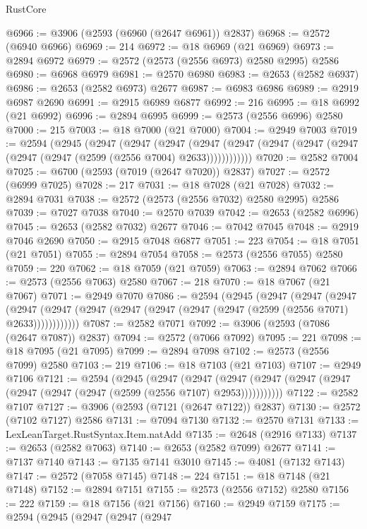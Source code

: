 \begin{lexlean}{RustCore}
\begin{coremodule}
@6966 := @3906 (@2593 (@6960 (@2647 @6961)) @2837)
@6968 := @2572 (@6940 @6966)
@6969 := 214
@6972 := @18 @6969 (@21 @6969)
@6973 := @2894 @6972
@6979 := @2572 (@2573 (@2556 @6973) @2580 @2995) @2586
@6980 := @6968 @6979
@6981 := @2570 @6980
@6983 := @2653 (@2582 @6937)
@6986 := @2653 (@2582 @6973) @2677
@6987 := @6983 @6986
@6989 := @2919 @6987 @2690
@6991 := @2915 @6989 @6877
@6992 := 216
@6995 := @18 @6992 (@21 @6992)
@6996 := @2894 @6995
@6999 := @2573 (@2556 @6996) @2580
@7000 := 215
@7003 := @18 @7000 (@21 @7000)
@7004 := @2949 @7003
@7019 := @2594
    (@2945
      (@2947
        (@2947
          (@2947
            (@2947 (@2947 (@2947 (@2947 (@2947 (@2947 (@2947 (@2599 (@2556 @7004) @2633))))))))))))
@7020 := @2582 @7004
@7025 := @6700 (@2593 (@7019 (@2647 @7020)) @2837)
@7027 := @2572 (@6999 @7025)
@7028 := 217
@7031 := @18 @7028 (@21 @7028)
@7032 := @2894 @7031
@7038 := @2572 (@2573 (@2556 @7032) @2580 @2995) @2586
@7039 := @7027 @7038
@7040 := @2570 @7039
@7042 := @2653 (@2582 @6996)
@7045 := @2653 (@2582 @7032) @2677
@7046 := @7042 @7045
@7048 := @2919 @7046 @2690
@7050 := @2915 @7048 @6877
@7051 := 223
@7054 := @18 @7051 (@21 @7051)
@7055 := @2894 @7054
@7058 := @2573 (@2556 @7055) @2580
@7059 := 220
@7062 := @18 @7059 (@21 @7059)
@7063 := @2894 @7062
@7066 := @2573 (@2556 @7063) @2580
@7067 := 218
@7070 := @18 @7067 (@21 @7067)
@7071 := @2949 @7070
@7086 := @2594
    (@2945
      (@2947
        (@2947
          (@2947
            (@2947 (@2947 (@2947 (@2947 (@2947 (@2947 (@2947 (@2599 (@2556 @7071) @2633))))))))))))
@7087 := @2582 @7071
@7092 := @3906 (@2593 (@7086 (@2647 @7087)) @2837)
@7094 := @2572 (@7066 @7092)
@7095 := 221
@7098 := @18 @7095 (@21 @7095)
@7099 := @2894 @7098
@7102 := @2573 (@2556 @7099) @2580
@7103 := 219
@7106 := @18 @7103 (@21 @7103)
@7107 := @2949 @7106
@7121 := @2594
    (@2945
      (@2947
        (@2947
          (@2947 (@2947 (@2947 (@2947 (@2947 (@2947 (@2947 (@2599 (@2556 @7107) @2953)))))))))))
@7122 := @2582 @7107
@7127 := @3906 (@2593 (@7121 (@2647 @7122)) @2837)
@7130 := @2572 (@7102 @7127) @2586
@7131 := @7094 @7130
@7132 := @2570 @7131
@7133 := LexLeanTarget.RustSyntax.Item.natAdd
@7135 := @2648 (@2916 @7133)
@7137 := @2653 (@2582 @7063)
@7140 := @2653 (@2582 @7099) @2677
@7141 := @7137 @7140
@7143 := @7135 @7141 @3010
@7145 := @4081 (@7132 @7143)
@7147 := @2572 (@7058 @7145)
@7148 := 224
@7151 := @18 @7148 (@21 @7148)
@7152 := @2894 @7151
@7155 := @2573 (@2556 @7152) @2580
@7156 := 222
@7159 := @18 @7156 (@21 @7156)
@7160 := @2949 @7159
@7175 := @2594
    (@2945
      (@2947
        (@2947
          (@2947

\end{coremodule}
\end{lexlean}
